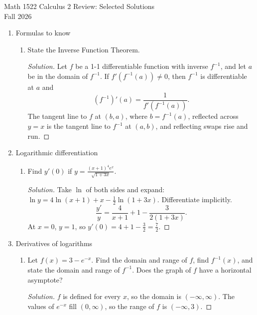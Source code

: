 \documentclass[12pt]{article}
\newenvironment{solution}
  {\renewcommand\qedsymbol{$\blacksquare$}\begin{proof}[Solution]}
  {\end{proof}}
\begin{document}
\raggedright
\begin{center}
      {\large Math 1522 Calculus 2 Review: Selected Solutions}\\
  {Fall 2026}\\
\end{center}

\begin{enumerate}
\setcounter{enumi}{0}
\item Formulas to know
\begin{enumerate}

\item[(b)] State the Inverse Function Theorem.
\begin{solution}
Let $f$ be a 1-1 differentiable function with inverse $f^{-1}$, and let $a$ be in the domain of $f^{-1}$. If $f'(f^{-1}(a))\neq 0$, then $f^{-1}$ is differentiable at $a$ and
\[ (f^{-1})'(a)=\frac{1}{f'(f^{-1}(a))}. \]
The tangent line to $f$ at $(b,a)$, where $b=f^{-1}(a)$, reflected across $y=x$ is the tangent line to $f^{-1}$ at $(a,b)$, and reflecting swaps rise and run.
\end{solution}

\end{enumerate}

\setcounter{enumi}{1}
\item Logarithmic differentiation
\begin{enumerate}


\item[(c)] Find $y'(0)$ if $y=\frac{(x+1)^4e^x}{\sqrt{1+3x}}$.
\begin{solution}
Take $\ln$ of both sides and expand: $\ln y=4\ln(x+1)+x-\frac12\ln(1+3x)$. Differentiate implicitly.
\[ \frac{y'}{y}=\frac{4}{x+1}+1-\frac{3}{2(1+3x)}. \]
At $x=0$, $y=1$, so $y'(0)=4+1-\frac32=\frac72$.
\end{solution}

\end{enumerate}

\setcounter{enumi}{2}
\item Derivatives of logarithms
\begin{enumerate}


\item[(c)] Let $f(x)=3-e^{-x}$. Find the domain and range of $f$, find $f^{-1}(x)$, and state the domain and range of $f^{-1}$. Does the graph of $f$ have a horizontal asymptote?
\begin{solution}
$f$ is defined for every $x$, so the domain is $(-\infty,\infty)$. The values of $e^{-x}$ fill $(0,\infty)$, so the range of $f$ is $(-\infty,3)$.


\end{solution}
\end{enumerate}
\end{enumerate}
\end{document}
